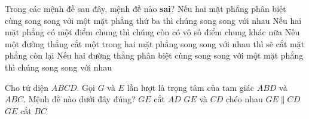 \begin{ex}%
Trong các mệnh đề sau đây, mệnh đề nào {\bf sai}?
\choice
{Nếu hai mặt phẳng phân biệt cùng song song với một mặt phẳng thứ ba thì chúng song song với nhau}
{Nếu hai mặt phẳng có một điểm chung thì chúng còn có vô số điểm chung khác nữa}
{Nếu một đường thẳng cắt một trong hai mặt phẳng song song với nhau thì sẽ cắt mặt phẳng còn lại}
{\True Nếu hai đường thẳng phân biệt cùng song song với một mặt phẳng thì chúng song song với nhau}
\end{ex}

\begin{ex}%
Cho tứ diện $ ABCD $. Gọi $ G $ và $ E $ lần lượt là trọng tâm của tam giác $ ABD $ và $ ABC $. Mệnh đề nào dưới đây đúng?
\choice
{$ GE $ cắt $ AD $}
{$ GE $ và $ CD $ chéo nhau}
{\True $GE\parallel CD$}
{$ GE $ cắt $ BC $}
\end{ex}
